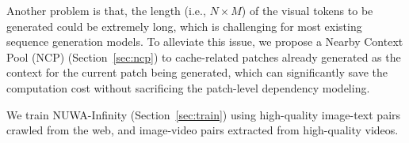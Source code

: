 \documentclass{article}
\begin{document}
Another problem is that, the length (i.e., $N \times M$) of the visual tokens to be generated could be extremely long, which is challenging for most existing sequence generation models. To alleviate this issue, we propose a Nearby Context Pool (NCP) (Section~\ref{sec:ncp}) to cache-related patches already generated as the context for the current patch being generated, which can significantly save the computation cost without sacrificing the patch-level dependency modeling.

We train NUWA-Infinity (Section~\ref{sec:train}) using high-quality image-text pairs crawled from the web, and image-video pairs extracted from high-quality videos.








\end{document}
